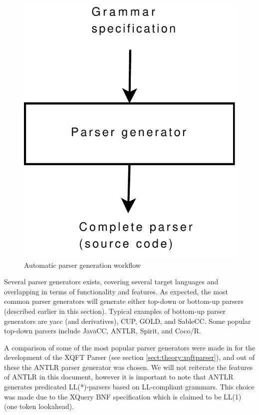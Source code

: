 \begin{figure}[h]
  \centering
    \includegraphics[scale=0.40]{diagrams/parser_generator}
  \caption{Automatic parser generation workflow}
  \label{figure:parser:generator}
\end{figure}

Several parser generators exists, covering several target languages and
overlapping in terms of functionality and features. As expected, the most
common parser generators will generate either top-down or bottom-up parsers
(described earlier in this section). Typical examples of bottom-up parser
generators are yacc (and derivatives), CUP, GOLD, and SableCC. Some popular
top-down parsers include JavaCC, ANTLR, Spirit, and Coco/R.

A comparison of some of the most popular parser generators were made in
\cite{ourselves} for the development of the XQFT Parser (see section \ref{sect:theory:xqftparser}), and out of these the ANTLR parser generator was
chosen. We will not reiterate the features of ANTLR in this document, however
it is important to note that ANTLR generates predicated LL(*)-parsers based on
LL-compliant grammars. This choice was made due to the XQuery BNF specification
which is claimed to be LL(1) (one token lookahead).

